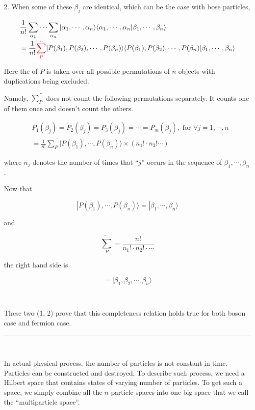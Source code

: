 {\Huge 2. }When some of these $\beta_j$ are identical, which can be the case with bose particles, 

\[\begin{split}
&\frac{1}{n!}\sum_{\alpha_1}\cdots\sum_{\alpha_n}|\alpha_1,\cdots,\alpha_n\rangle\langle\alpha_1,\cdots,\alpha_n|\beta_1,\cdots,\beta_n\rangle \\
&= \frac{1}{n!}{\color{red}{\tilde{\sum_P}}}|P(\beta_1),P(\beta_2),\cdots,P(\beta_n)\rangle\langle P(\beta_1),P(\beta_2),\cdots,P(\beta_n)|\beta_1,\cdots,\beta_n\rangle \end{split}\]

Here the {\color{red}{summation}} of $P$ is taken over all possible permutations of $n$-objects with duplications being excluded. 

Namely, $\tilde{\sum_P}$ does not count the following permutations separately. It counts one of them once and doesn't count the others.

\[
\begin{split}
&P_1(\beta_j) = P_2(\beta_j) = P_3(\beta_j)=\cdots=P_m(\beta_j), \text{ for }\forall j = 1,\cdots,n\\ 
&=\frac{1}{n!}\tilde{\sum_P}|P(\beta_1),\cdots,P(\beta_n)\rangle\times(n_1!\cdot n_2!\cdots)
\end{split}\]

where $n_j$ denotes the number of times that ``$j$'' occurs in the sequence of $\beta_1,\cdots,\beta_n$. 

Now that 

\[|P(\beta_1),\cdots,P(\beta_n)\rangle = |\beta_1,\cdots,\beta_n\rangle \]

and

\[\tilde{\sum_P} = \frac{n!}{n_1!\cdot n_2!\cdot\cdots} \]

the right hand side is

\[=|\beta_1,\beta_2,\cdots,\beta_n\rangle \]

\ 

These two ({\Huge 1, 2}) prove that this completeness relation holds true for both boson case and fermion case. \\

\hrule

\ 

In actual physical process, the number of particles is not constant in time. Particles can be constructed and destroyed. To describe such process, we need a Hilbert space that contains states of varying number of particles. To get such a space, we simply combine all the $n$-particle spaces into one big space that we call the ``multiparticle space''. 

